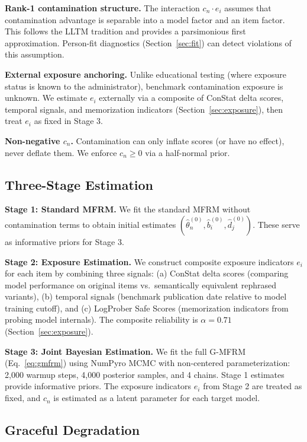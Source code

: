 \documentclass[11pt]{article}
\begin{document}
\textbf{Rank-1 contamination structure.} The interaction $c_n \cdot e_i$ assumes that contamination advantage is separable into a model factor and an item factor. This follows the LLTM tradition and provides a parsimonious first approximation. Person-fit diagnostics (Section~\ref{sec:fit}) can detect violations of this assumption.

\textbf{External exposure anchoring.} Unlike educational testing (where exposure status is known to the administrator), benchmark contamination exposure is unknown. We estimate $e_i$ externally via a composite of ConStat delta scores, temporal signals, and memorization indicators (Section~\ref{sec:exposure}), then treat $e_i$ as fixed in Stage 3.

\textbf{Non-negative $c_n$.} Contamination can only inflate scores (or have no effect), never deflate them. We enforce $c_n \geq 0$ via a half-normal prior.

\subsection{Three-Stage Estimation}

\textbf{Stage 1: Standard MFRM.} We fit the standard MFRM without contamination terms to obtain initial estimates $(\hat{\theta}_n^{(0)}, \hat{b}_i^{(0)}, \hat{d}_j^{(0)})$. These serve as informative priors for Stage 3.

\textbf{Stage 2: Exposure Estimation.} We construct composite exposure indicators $e_i$ for each item by combining three signals: (a) ConStat delta scores (comparing model performance on original items vs.\ semantically equivalent rephrased variants), (b) temporal signals (benchmark publication date relative to model training cutoff), and (c) LogProber Safe Scores (memorization indicators from probing model internals). The composite reliability is $\alpha = 0.71$ (Section~\ref{sec:exposure}).

\textbf{Stage 3: Joint Bayesian Estimation.} We fit the full G-MFRM (Eq.~\ref{eq:gmfrm}) using NumPyro MCMC with non-centered parameterization: 2,000 warmup steps, 4,000 posterior samples, and 4 chains. Stage 1 estimates provide informative priors. The exposure indicators $e_i$ from Stage 2 are treated as fixed, and $c_n$ is estimated as a latent parameter for each target model.

\subsection{Graceful Degradation}
\end{document}

